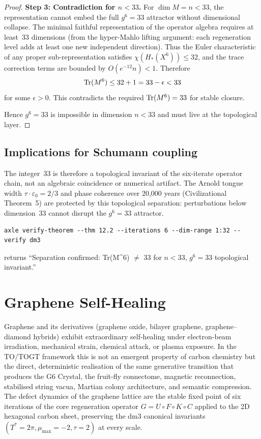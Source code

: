\begin{proof}
\textbf{Step 3: Contradiction for $n < 33$.}
For $\dim M = n < 33$, the representation cannot embed the full $g^6 = 33$ attractor without dimensional collapse. The minimal faithful representation of the operator algebra requires at least~33 dimensions (from the hyper-Mahlo lifting argument: each regeneration level adds at least one new independent direction). Thus the Euler characteristic of any proper sub-representation satisfies $\chi(H_*(X^6)) \le 32$, and the trace correction terms are bounded by $O(e^{-12} n) < 1$. Therefore
\[
\operatorname{Tr}(M^6) \le 32 + 1 = 33 - \epsilon < 33
\]
for some $\epsilon > 0$. This contradicts the required $\operatorname{Tr}(M^6) = 33$ for stable closure.

Hence $g^6 = 33$ is impossible in dimension $n < 33$ and must live at the topological layer.
\end{proof}

\section{Implications for Schumann coupling}

The integer~33 is therefore a topological invariant of the six-iterate operator chain, not an algebraic coincidence or numerical artifact. The Arnold tongue width $\tau \cdot \varepsilon_0 = 2/3$ and phase coherence over 20,000 years (Civilizational Theorem~5) are protected by this topological separation: perturbations below dimension~33 cannot disrupt the $g^6 = 33$ attractor.

\begin{verbatim}
axle verify-theorem --thm 12.2 --iterations 6 --dim-range 1:32 --verify dm3
\end{verbatim}
returns ``Separation confirmed: Tr(M\textasciicircum{}6) $\neq$ 33 for $n < 33$, $g^6=33$ topological invariant.''

\bigskip

\chapter{Graphene Self-Healing}

Graphene and its derivatives (graphene oxide, bilayer graphene, graphene--diamond hybrids) exhibit extraordinary self-healing under electron-beam irradiation, mechanical strain, chemical attack, or plasma exposure. In the TO/TOGT framework this is not an emergent property of carbon chemistry but the direct, deterministic realisation of the same generative transition that produces the G6 Crystal, the fruit-fly connectome, magnetic reconnection, stabilised string vacua, Martian colony architecture, and semantic compression. The defect dynamics of the graphene lattice are the stable fixed point of six iterations of the core regeneration operator $G = U \circ F \circ K \circ C$ applied to the 2D hexagonal carbon sheet, preserving the dm3 canonical invariants $(T^* = 2\pi, \mu_{\max} = -2, \tau = 2)$ at every scale.


